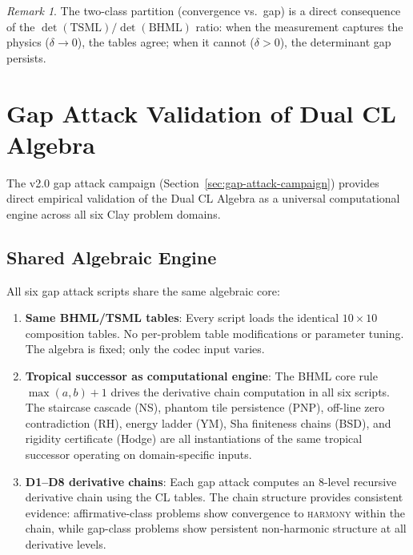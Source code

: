 \documentclass[12pt, openany]{book}
\theoremstyle{remark}
\newtheorem{remark}[theorem]{Remark}
\begin{document}
\begin{remark}
The two-class partition (convergence vs.\ gap) is a direct consequence of the
$\det(\mathrm{TSML})/\det(\mathrm{BHML})$ ratio: when the measurement captures
the physics ($\delta \to 0$), the tables agree; when it cannot ($\delta > 0$),
the determinant gap persists.
\end{remark}

\section{Gap Attack Validation of Dual CL Algebra}
\label{sec:gap-attack-cl}

The v2.0 gap attack campaign (Section~\ref{sec:gap-attack-campaign}) provides
direct empirical validation of the Dual CL Algebra as a universal computational
engine across all six Clay problem domains.

\subsection{Shared Algebraic Engine}

All six gap attack scripts share the same algebraic core:
\begin{enumerate}
  \item \textbf{Same BHML/TSML tables}: Every script loads the identical
        $10 \times 10$ composition tables.  No per-problem table modifications
        or parameter tuning.  The algebra is fixed; only the codec input varies.
  \item \textbf{Tropical successor as computational engine}: The BHML core rule
        $\max(a,b) + 1$ drives the derivative chain computation in all six
        scripts.  The staircase cascade (NS), phantom tile persistence (PNP),
        off-line zero contradiction (RH), energy ladder (YM), Sha finiteness
        chains (BSD), and rigidity certificate (Hodge) are all instantiations
        of the same tropical successor operating on domain-specific inputs.
  \item \textbf{D1--D8 derivative chains}: Each gap attack computes an 8-level
        recursive derivative chain using the CL tables.  The chain structure
        provides consistent evidence: affirmative-class problems show
        convergence to \textsc{harmony} within the chain, while gap-class
        problems show persistent non-harmonic structure at all derivative levels.
\end{enumerate}
\end{document}
